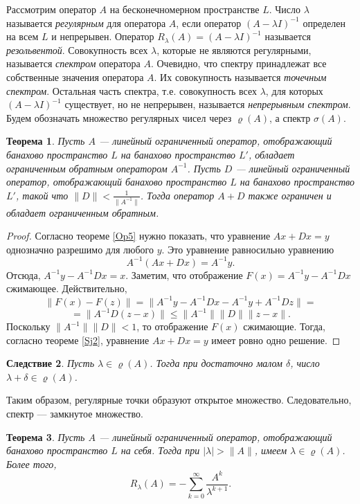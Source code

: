 \documentclass[12pt, titlepage, oneside]{amsbook}
\newtheorem{theorem}{Теорема}[chapter]
\newtheorem{corollary}[theorem]{Следствие}
\theoremstyle{definition}
\theoremstyle{remark}
\begin{document}
Рассмотрим оператор $A$ на бесконечномерном пространстве $L$. Число $\lambda$ называется \emph{регулярным} для оператора $A$, если оператор $(A-\lambda I)^{-1}$ определен на всем $L$ и непрерывен. Оператор $R_{\lambda}(A)=(A-\lambda I)^{-1}$ называется \emph{резольвентой}. Совокупность всех $\lambda$, которые не являются регулярными, называется \emph{спектром} оператора $A$. Очевидно, что спектру принадлежат все собственные значения оператора $A$. Их совокупность называется \emph{точечным спектром}. Остальная часть спектра, т.е. совокупность всех $\lambda$, для которых $(A-\lambda I)^{-1}$ существует, но не непрерывен, называется \emph{непрерывным спектром}. Будем обозначать множество регулярных чисел через $\varrho(A)$, а спектр $\sigma(A)$.

\begin{theorem}
	\label{Sp1}
	Пусть $A$  --- линейный ограниченный оператор, отображающий банахово пространство $L$ на банахово пространство $L'$, обладает ограниченным обратным оператором $A^{-1}$. Пусть $D$  --- линейный ограниченный оператор, отображающий банахово пространство $L$ на банахово пространство $L'$, такой что $\|D\|<\frac{1}{\|A^{-1}\|}$. Тогда оператор $A+D$ также ограничен и обладает ограниченным обратным.
\end{theorem}

\begin{proof}
	Согласно теореме \ref{Op5} нужно показать, что уравнение $Ax+Dx=y$ однозначно разрешимо для любого $y$. Это уравнение равносильно уравнению $$A^{-1}(Ax+Dx)=A^{-1}y.$$ Отсюда, $A^{-1}y-A^{-1}Dx=x.$ Заметим, что отображение $F(x)=A^{-1}y-A^{-1}Dx$ сжимающее. Действительно, $$\|F(x)-F(z)\|=\|A^{-1}y-A^{-1}Dx-A^{-1}y+A^{-1}Dz\|=$$ $$=\|A^{-1}D(z-x)\|\leq\|A^{-1}\|\|D\|\|z-x\|.$$ Поскольку $\|A^{-1}\|\|D\|<1$, то отображение $F(x)$ сжимающие. Тогда, согласно теореме \ref{Sj2}, уравнение $Ax+Dx=y$ имеет ровно одно решение.
\end{proof}

\begin{corollary}
	\label{Sp2}
	Пусть $\lambda\in\varrho(A)$. Тогда при достаточно малом $\delta$, число $\lambda+\delta\in\varrho(A)$.
\end{corollary}

Таким образом, регулярные точки образуют открытое множество. Следовательно, спектр --- замкнутое множество.

\begin{theorem}
	\label{Sp3}
	Пусть $A$  --- линейный ограниченный оператор, отображающий банахово пространство $L$ на себя. Тогда при $|\lambda|>\|A\|$, имеем $\lambda\in\varrho(A)$. Более того, $$R_{\lambda}(A)=-\sum\limits_{k=0}^{\infty}\frac{A^k}{\lambda^{k+1}}.$$
\end{theorem}
\end{document}
